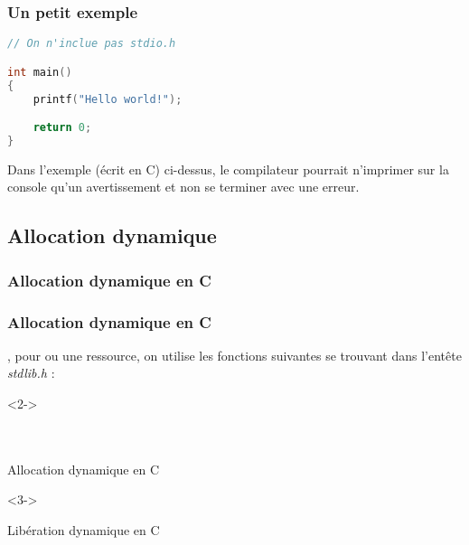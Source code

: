 \documentclass{cppcourses}
\begin{document}
\begin{frame}[fragile]

\frametitle{Un petit exemple}

\begin{example}

\begin{lstlisting}[language = c]
// On n'inclue pas stdio.h

int main()
{
    printf("Hello world!");

    return 0;
}
\end{lstlisting}

Dans l'exemple (écrit en C) ci-dessus, le compilateur pourrait n'imprimer sur la console qu'un avertissement et non se terminer avec une erreur.

\end{example}

\end{frame}

\subsection{Allocation dynamique}

\subsubsection{Allocation dynamique en C}

\begin{frame}

\frametitle{Allocation dynamique en C}

, pour  ou  une ressource, on utilise les fonctions suivantes se trouvant dans l'entête \emph{stdlib.h} :

\begin{myfigure}<2->
 \\
 \\
 \\
\caption{Allocation dynamique en C}
\end{myfigure}

\begin{myfigure}<3->
\caption{Libération dynamique en C}
\end{myfigure}

\end{frame}
\end{document}
